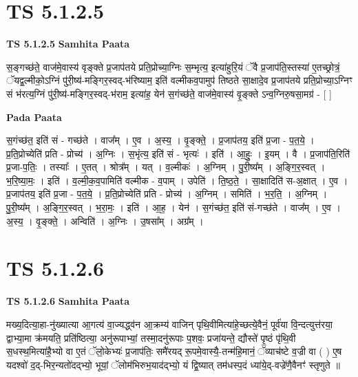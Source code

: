 \documentclass[17pt]{extarticle}
\begin{document}
\section*{ TS 5.1.2.5 }

\textbf{TS 5.1.2.5 } \newline
\textbf{Samhita Paata} \newline

स॒ङ्गच्छ॑ते॒ वाज॑मे॒वास्य॑ वृङ्क्ते प्र॒जाप॑तये प्रति॒प्रोच्या॒ग्निः स॒म्भृत्य॒ इत्या॑हुरि॒यं ॅवै प्र॒जाप॑ति॒स्तस्या॑ ए॒तच्छ्रोत्रं॒ ॅयद्व॒ल्मीको॒ऽग्निं पु॑री॒ष्य॑-मङ्गिर॒स्वद्-भ॑रिष्याम॒ इति॑ वल्मीकव॒पामुप॑ तिष्ठते सा॒क्षादे॒व प्र॒जाप॑तये प्रति॒प्रोच्या॒ऽग्निꣳ सं भ॑रत्य॒ग्निं पु॑री॒ष्य॑-मङ्गिर॒स्वद्-भ॑राम॒ इत्या॑ह॒ येन॑ स॒गंच्छ॑ते॒ वाज॑मे॒वास्य॑ वृ॒ङ्क्ते ऽन्व॒ग्निरु॒षसा॒मग्र॑ - [  ] \newline

\textbf{Pada Paata} \newline

स॒गंच्छ॑त॒ इति॑ सं - गच्छ॑ते । वाज᳚म् । ए॒व । अ॒स्य॒ । वृ॒ङ्क्ते॒ । प्र॒जाप॑तय॒ इति॑ प्र॒जा - प॒त॒ये॒ । प्र॒ति॒प्रोच्येति॑ प्रति - प्रोच्य॑ । अ॒ग्निः । स॒भृंत्य॒ इति॑ सं - भृत्यः॑ । इति॑ । आ॒हुः॒ । इ॒यम् । वै । प्र॒जाप॑ति॒रिति॑ प्र॒जा-प॒तिः॒ । तस्याः᳚ । ए॒तत् । श्रोत्र᳚म् । यत् । व॒ल्मीकः॑ । अ॒ग्निम् । पु॒री॒ष्य᳚म् । अ॒ङ्गि॒र॒स्वत् । भ॒रि॒ष्या॒मः॒ । इति॑ । व॒ल्मी॒क॒व॒पामिति॑ वल्मीक - व॒पाम् । उपेति॑ । ति॒ष्ठ॒ते॒ । सा॒क्षादिति॑ स-अ॒क्षात् । ए॒व । प्र॒जाप॑तय॒ इति॑ प्र॒जा - प॒त॒ये॒ । प्र॒ति॒प्रोच्येति॑ प्रति - प्रोच्य॑ । अ॒ग्निम् । समिति॑ । भ॒र॒ति॒ । अ॒ग्निम् । पु॒री॒ष्य᳚म् । अ॒ङ्गि॒र॒स्वत् । भ॒रा॒मः॒ । इति॑ । आ॒ह॒ । येन॑ । स॒गंच्छ॑त॒ इति॑ सं-गच्छ॑ते । वाज᳚म् । ए॒व । अ॒स्य॒ । वृ॒ङ्क्ते॒ । अन्विति॑ । अ॒ग्निः । उ॒षसा᳚म् । अग्र᳚म् ।  \newline




\section*{ TS 5.1.2.6 }

\textbf{TS 5.1.2.6 } \newline
\textbf{Samhita Paata} \newline

मख्य॒दित्या॒हा-नु॑ख्यात्या आ॒गत्य॑ वा॒ज्यद्ध्व॑न आ॒क्रम्य॑ वाजिन् पृथि॒वीमित्या॑हे॒च्छत्ये॒वैनं॒ पूर्व॑या वि॒न्दत्युत्त॑रया॒ द्वाभ्या॒मा क्र॑मयति॒ प्रति॑ष्ठित्या॒ अनु॑रूपाभ्यां॒ तस्मा॒दनु॑रूपाः प॒शवः॒ प्रजा॑यन्ते॒ द्यौस्ते॑ पृ॒ष्ठं पृ॑थि॒वी स॒धस्थ॒मित्या॑है॒भ्यो वा ए॒तं ॅलो॒केभ्यः॑ प्र॒जाप॑तिः॒ समै॑रयद् रू॒पमे॒वास्यै॒-तन्म॑हि॒मानं॒ ॅव्याच॑ष्टे व॒ज्री वा ( ) ए॒ष यदश्वो॑ द॒द्-भिर॒न्यतो॑दद्भ्यो॒ भूयां॒ ॅलोम॑भिरुभ॒याद॑द्भ्यो॒ यं द्वि॒ष्यात् तम॑धस्प॒दं ध्या॑ये॒द्-वज्रे॑णै॒वैनꣳ॑ स्तृणुते ॥ \newline
\end{document}

